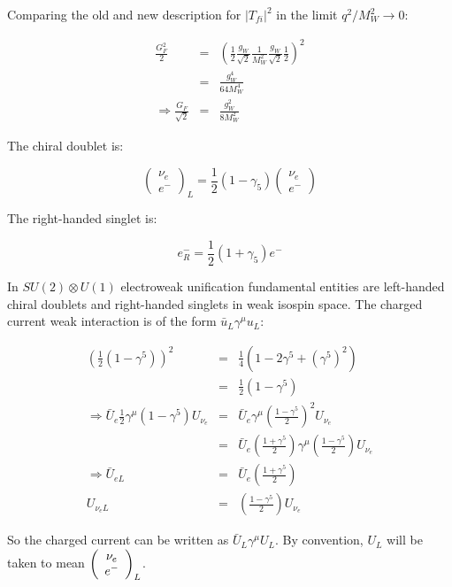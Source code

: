 Comparing the old and new description for $|T_{fi}|^2$ in the limit $q^2/M_W^2 \to 0$:

\begin{eqnarray*}
  \frac{G_F^2}{2} & = & \left(\frac{1}{2}\frac{g_W}{\sqrt{2}}\frac{1}{M_W^2}\frac{g_W}{\sqrt{2}}\frac{1}{2}\right)^2 \\
  & = & \frac{g_W^4}{64M_W^4} \\
  \Rightarrow \frac{G_F}{\sqrt{2}} & = & \frac{g_W^2}{8M_W^2}
\end{eqnarray*}

The chiral doublet is:

\[
  \left(
    \begin{array}{c}
    \nu_{e} \\
    e^-
    \end{array}
  \right)_L
  = \frac{1}{2}\left(1 - \gamma_5\right)
  \left(
    \begin{array}{c}
    \nu_{e} \\
    e^-
    \end{array}
  \right)
\]

The right-handed singlet is:

\[
  e^-_R = \frac{1}{2}\left(1 + \gamma_5\right)e^-
\]

In $SU(2)\otimes U(1)$ electroweak unification fundamental entities are left-handed chiral doublets and right-handed singlets in weak isospin space.  The charged current weak interaction is of the form $\bar{u}_L\gamma^{\mu}u_L$:

\begin{eqnarray*}
  \left(\frac{1}{2}\left(1 - \gamma^5\right)\right)^2 & = & \frac{1}{4}\left(1 - 2\gamma^5 + \left(\gamma^5\right)^2\right) \\
  & = & \frac{1}{2}\left(1 - \gamma^5\right) \\
  \Rightarrow \bar{U}_e \frac{1}{2}\gamma^{\mu}\left(1 - \gamma^5\right)U_{\nu_e} & = & \bar{U}_e \gamma^{\mu}\left(\frac{1 - \gamma^5}{2}\right)^2U_{\nu_e} \\
  & = & \bar{U}_e \left(\frac{1 + \gamma^5}{2}\right)\gamma^{\mu}\left(\frac{1 - \gamma^5}{2}\right)U_{\nu_e} \\
  \Rightarrow \bar{U}_{eL} & = & \bar{U}_e\left(\frac{1 + \gamma^5}{2}\right) \\
  U_{\nu_eL} & = & \left(\frac{1 - \gamma^5}{2}\right)U_{\nu_e}
\end{eqnarray*}

So the charged current can be written as $\bar{U}_L \gamma^{\mu}U_L$.  By convention, $U_L$ will be taken to mean $\left(\begin{array}{c}\nu_e\\ e^-\end{array}\right)_L$.

